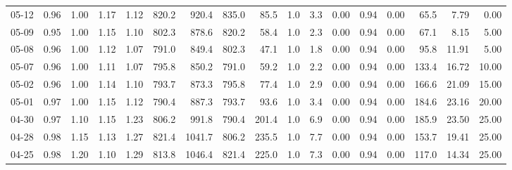 \begin{threeparttable}
{\begin{tabular}{lrrrrrrrrrrrrrrrr}
  05-12 &         0.96 &           1.00 &          1.17 &          1.12 & 820.2 &  920.4 & 835.0 &       85.5 &                      1.0 &                 3.3 &       0.00 &      0.94 &           0.00 &             65.5 &            7.79 &                   0.00 \\
  05-09 &         0.95 &           1.00 &          1.15 &          1.10 & 802.3 &  878.6 & 820.2 &       58.4 &                      1.0 &                 2.3 &       0.00 &      0.94 &           0.00 &             67.1 &            8.15 &                   5.00 \\
  05-08 &         0.96 &           1.00 &          1.12 &          1.07 & 791.0 &  849.4 & 802.3 &       47.1 &                      1.0 &                 1.8 &       0.00 &      0.94 &           0.00 &             95.8 &           11.91 &                   5.00 \\
  05-07 &         0.96 &           1.00 &          1.11 &          1.07 & 795.8 &  850.2 & 791.0 &       59.2 &                      1.0 &                 2.2 &       0.00 &      0.94 &           0.00 &            133.4 &           16.72 &                  10.00 \\
  05-02 &         0.96 &           1.00 &          1.14 &          1.10 & 793.7 &  873.3 & 795.8 &       77.4 &                      1.0 &                 2.9 &       0.00 &      0.94 &           0.00 &            166.6 &           21.09 &                  15.00 \\
  05-01 &         0.97 &           1.00 &          1.15 &          1.12 & 790.4 &  887.3 & 793.7 &       93.6 &                      1.0 &                 3.4 &       0.00 &      0.94 &           0.00 &            184.6 &           23.16 &                  20.00 \\
  04-30 &         0.97 &           1.10 &          1.15 &          1.23 & 806.2 &  991.8 & 790.4 &      201.4 &                      1.0 &                 6.9 &       0.00 &      0.94 &           0.00 &            185.9 &           23.50 &                  25.00 \\
  04-28 &         0.98 &           1.15 &          1.13 &          1.27 & 821.4 & 1041.7 & 806.2 &      235.5 &                      1.0 &                 7.7 &       0.00 &      0.94 &           0.00 &            153.7 &           19.41 &                  25.00 \\
  04-25 &         0.98 &           1.20 &          1.10 &          1.29 & 813.8 & 1046.4 & 821.4 &      225.0 &                      1.0 &                 7.3 &       0.00 &      0.94 &           0.00 &            117.0 &           14.34 &                  25.00 \\

\end{tabular}}
\end{threeparttable}
